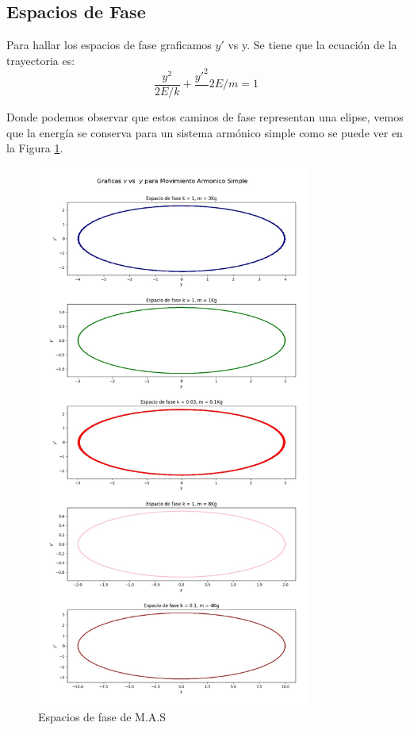 \documentclass[a4paper]{article}
\begin{document}
\subsection{Espacios de Fase}

Para hallar los espacios de fase graficamos $y'$ vs y.
Se tiene que la ecuación de la trayectoria es: $$\frac{y^2}{2E/k}+\frac{y'^2}{}2E/m=1$$ 

Donde podemos observar que estos caminos de fase representan una elipse, vemos que la energía se conserva para un sistema armónico simple como se puede ver en la Figura \ref{fig:Figura2}.

\begin{figure}
\centering
\includegraphics[width=0.8\textwidth]{MAS_FASE.jpg}
\caption{Espacios de fase de M.A.S}
\label{fig:Figura2}
\end{figure}
\end{document}
